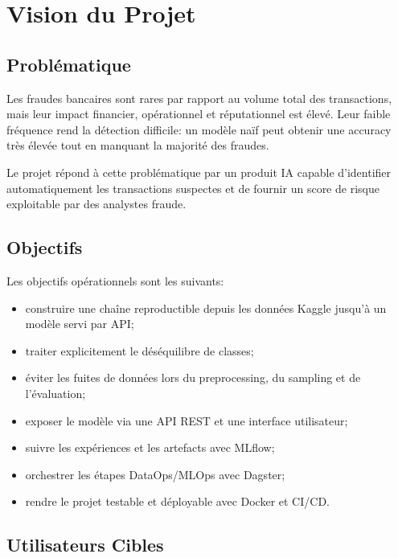 \chapter{Vision du Projet}

\section{Problématique}

Les fraudes bancaires sont rares par rapport au volume total des transactions, mais leur impact financier, opérationnel et réputationnel est élevé. Leur faible fréquence rend la détection difficile: un modèle naïf peut obtenir une accuracy très élevée tout en manquant la majorité des fraudes.

Le projet répond à cette problématique par un produit IA capable d'identifier automatiquement les transactions suspectes et de fournir un score de risque exploitable par des analystes fraude.

\section{Objectifs}

Les objectifs opérationnels sont les suivants:

\begin{itemize}
    \item construire une chaîne reproductible depuis les données Kaggle jusqu'à un modèle servi par API;
    \item traiter explicitement le déséquilibre de classes;
    \item éviter les fuites de données lors du preprocessing, du sampling et de l'évaluation;
    \item exposer le modèle via une API REST et une interface utilisateur;
    \item suivre les expériences et les artefacts avec MLflow;
    \item orchestrer les étapes DataOps/MLOps avec Dagster;
    \item rendre le projet testable et déployable avec Docker et CI/CD.
\end{itemize}

\section{Utilisateurs Cibles}

